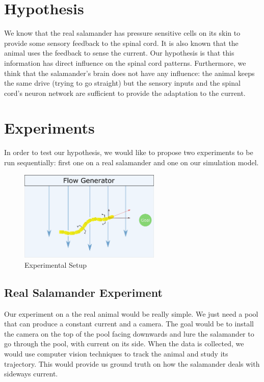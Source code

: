 \documentclass{article}
\begin{document}
\section{Hypothesis}
We know that the real salamander has pressure sensitive cells on its skin to provide some sensory feedback to the spinal cord. It is also known that the animal uses the feedback to sense the current. Our hypothesis is that this information has direct influence on the spinal cord patterns. Furthermore, we think that the salamander's brain does not have any influence: the animal keeps the same drive (trying to go straight) but the sensory inputs and the spinal cord's neuron network are sufficient to provide the adaptation to the current. 

\section{Experiments}
In order to test our hypothesis, we would like to propose two experiments to be run sequentially: first one on a real salamander and one on our simulation model. 
\begin{figure}[!ht]
    \centering
    \includegraphics[width=0.6\textwidth]{flow.png}
    \caption{Experimental Setup}
    \label{setup}
\end{figure}

\subsection{Real Salamander Experiment}
Our experiment on a the real animal would be really simple. We just need a pool that can produce a constant current and a camera. The goal would be to install the camera on the top of the pool facing downwards and lure the salamander to go through the pool, with current on its side. When the data is collected, we would use computer vision techniques to track the animal and study its trajectory. This would provide us ground truth on how the salamander deals with sideways current. 
\end{document}
